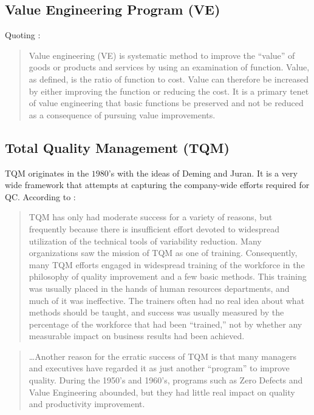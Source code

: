 \documentclass[12pt,a4paper]{report}
\begin{document}
\subsection{Value Engineering Program (VE)}
Quoting \cite{wikipedia_value_2015}:
\begin{quote}
Value engineering (VE) is systematic method to improve the ``value'' of goods or products and services by using an examination of function. Value, as defined, is the ratio of function to cost. Value can therefore be increased by either improving the function or reducing the cost. It is a primary tenet of value engineering that basic functions be preserved and not be reduced as a consequence of pursuing value improvements.

\end{quote}

\subsection{Total Quality Management (TQM)}
TQM originates in the $1980$'s with the ideas of Deming and Juran.
It is a very wide framework that attempts at capturing the company-wide efforts required for QC. 
According to \citet[p.23]{montgomery_introduction_2007}:
\begin{quote}
TQM has only had moderate success for a variety of reasons, but frequently because there is insufficient effort devoted to widespread utilization of the technical tools of variability reduction. Many organizations saw the mission of TQM as one of training. Consequently, many TQM efforts engaged in widespread training of the workforce in the philosophy of quality improvement and a few basic methods.
This training was usually placed in the hands of human resources departments, and much of it was ineffective. The trainers often had no real idea about what methods should be taught, and success was usually measured by the percentage of the workforce that had been ``trained,'' not by whether any measurable impact on business results had been achieved.
\end{quote}

\begin{quote}
\dots Another reason for the erratic success of TQM is that many managers and executives
have regarded it as just another “program” to improve quality. During the 1950's and 1960's, programs such as Zero Defects and Value Engineering abounded, but they had little real impact on quality and productivity improvement.
\end{quote}
\end{document}
